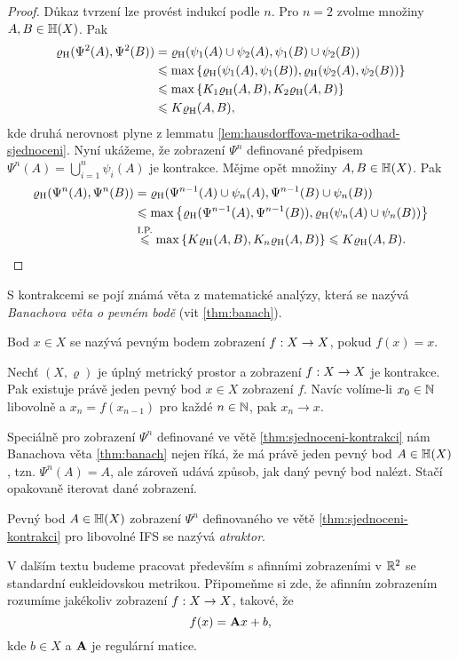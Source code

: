 \begin{proof}
    Důkaz tvrzení lze provést indukcí podle $n$. Pro $n=2$ zvolme množiny $A,B\in\mathbb{H}(X)$. Pak
    \begin{align*}
        \varrho_\textup{H}(\Psi^2(A),\Psi^2(B))&=\varrho_\textup{H}(\psi_1(A)\cup\psi_2(A),\psi_1(B)\cup\psi_2(B))\\
        &\leqslant\max\left\{\varrho_\textup{H}(\psi_1(A),\psi_1(B)),\varrho_\textup{H}(\psi_2(A),\psi_2(B))\right\}\\
        &\leqslant\max\left\{K_1\varrho_\textup{H}(A,B),K_2\varrho_\textup{H}(A,B)\right\}\\
        &\leqslant K\varrho_\textup{H}(A,B),
    \end{align*}
    kde druhá nerovnost plyne z lemmatu \ref{lem:hausdorffova-metrika-odhad-sjednoceni}. Nyní ukážeme, že zobrazení $\Psi^n$ definované předpisem $\Psi^n(A)=\bigcup_{i=1}^n\psi_i(A)$ je kontrakce. Mějme opět množiny $A,B\in\mathbb{H}(X)$. Pak
    \begin{align*}
        \varrho_\textup{H}(\Psi^n(A),\Psi^n(B))&=\varrho_\textup{H}(\Psi^{n-1}(A)\cup\psi_n(A),\Psi^{n-1}(B)\cup\psi_n(B))\\
        &\leqslant\max\left\{\varrho_\textup{H}(\Psi^{n-1}(A),\Psi^{n-1}(B)),\varrho_\textup{H}(\psi_n(A)\cup\psi_n(B))\right\}\\
        &\stackrel{\text{I.P.}}{\leqslant}\max\left\{K\varrho_\textup{H}(A,B),K_n\varrho_\textup{H}(A,B)\right\}\leqslant K\varrho_\textup{H}(A,B).
    \end{align*}
\end{proof}

S kontrakcemi se pojí známá věta z matematické analýzy, která se nazývá \emph{Banachova věta o pevném bodě} (vit \ref{thm:banach}).
\begin{definition}\label{def:pevny-bod}
    Bod $x\in X$ se nazývá pevným bodem zobrazení $f:X \rightarrow X$, pokud $f(x)=x$.
\end{definition}
\begin{theorem}\label{thm:banach}
    Nechť $(X,\varrho)$ je úplný metrický prostor a zobrazení $f:X \rightarrow X$ je kontrakce. Pak existuje právě jeden pevný bod $x\in X$ zobrazení $f$. Navíc volíme-li $x_0\in\mathbb{N}$ libovolně a $x_n=f(x_{n-1})$ pro každé $n\in\mathbb{N}$, pak $x_n\to x$.
\end{theorem}
Speciálně pro zobrazení $\Psi^n$ definované ve větě \ref{thm:sjednoceni-kontrakci} nám Banachova věta \ref{thm:banach} nejen říká, že má právě jeden pevný bod $A\in\mathbb{H}(X)$, tzn. $\Psi^n(A)=A$, ale zároveň udává způsob, jak daný pevný bod nalézt. Stačí opakovaně iterovat dané zobrazení.
\begin{definition}[Atraktor]\label{def:atraktor}
    Pevný bod $A\in\mathbb{H}(X)$ zobrazení $\Psi^n$ definovaného ve větě \ref{thm:sjednoceni-kontrakci} pro libovolné IFS se nazývá \emph{atraktor}.
\end{definition}
V dalším textu budeme pracovat především s afinními zobrazeními v $\mathbb{R}^2$ se standardní eukleidovskou metrikou. Připomeňme si zde, že afinním zobrazením rozumíme jakékoliv zobrazení $f:X \rightarrow X$, takové, že
\[f(x)=\mathbf{A}x+b,\]
kde $b\in X$ a $\mathbf{A}$ je regulární matice.